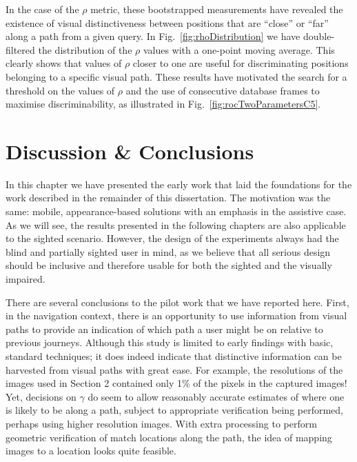 In the case of the $\rho$ metric, these bootstrapped measurements have revealed the existence of visual distinctiveness between positions that are ``close'' or ``far'' along a path from a given query. In Fig.~\ref{fig:rhoDistribution} we have double-filtered the distribution of the $\rho$ values with a one-point moving average. This clearly shows that values of $\rho$ closer to one are useful for discriminating positions belonging to a specific visual path. These results have motivated the search for a threshold on the values of $\rho$ and the use of consecutive database frames to maximise discriminability, as illustrated in Fig.~\ref{fig:rocTwoParametersC5}.




\section{Discussion \& Conclusions}

In this chapter we have presented the early work that laid the foundations for the work described in the remainder of this dissertation. The motivation was the same: mobile, appearance-based solutions with an emphasis in the assistive case. As we will see, the results presented in the following chapters are also applicable to the sighted scenario. However, the design of the experiments always had the blind and partially sighted user in mind, as we believe that all serious design should be inclusive and therefore usable for both the sighted and the visually impaired. 

There are several conclusions to the pilot work that we have reported here.  First, in the navigation context, there is an opportunity to use information from visual paths to provide an indication of which path a user might be on relative to previous journeys.  Although this study is limited to early findings with basic, standard techniques; it does indeed indicate that distinctive information can be harvested from visual paths with great ease.  For example, the resolutions of the images used in Section 2 contained only 1\% of the pixels in the captured images!  Yet, decisions on $\gamma$ do seem to allow reasonably accurate estimates of where one is likely to be along a path, subject to appropriate verification being performed, perhaps using higher resolution images. With extra processing to perform geometric verification of match locations along the path, the idea of mapping images to a location looks quite feasible.

